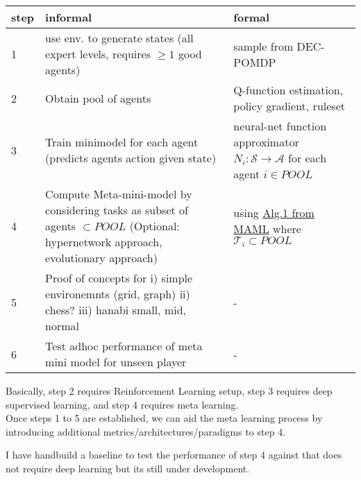 \documentclass[a4paper, 11pt]{article}
\begin{document}
\begin{tabularx}{\textwidth}{|l|X|X|}
    step & informal & formal \\
\hline
    1 & use env. to generate states 
		(all expert levels, requires $\geq 1$  good agents)  
	& sample from DEC-POMDP \\
\hline
    2 & Obtain pool of agents 
	& Q-function estimation, policy gradient, ruleset\\
\hline
    3 & Train minimodel for each agent (predicts agents action given state) & neural-net function approximator $N_i: \mathcal{S} \rightarrow \mathcal{A}$ for each agent $i \in POOL$\\
\hline
   4 & Compute Meta-mini-model by considering tasks as subset of agents $\subset POOL$ (Optional: hypernetwork approach, evolutionary approach) & using \href{https://proceedings.mlr.press/v70/finn17a/finn17a.pdf}{Alg.1 from MAML} where $\mathcal{T}_i \subset{POOL}$ \\
\hline
  5 & Proof of concepts for i) simple environemnts (grid, graph)  ii) chess? iii) hanabi small, mid, normal & - \\
\hline
  6 & Test adhoc performance of meta mini model for unseen player & -\\
\hline 
\end{tabularx}

Basically, step 2 requires Reinforcement Learning setup, step 3 requires deep supervised learning, and step 4 requires meta learning. \\

Once steps 1 to 5 are established, we can aid the meta learning process by introducing additional metrics/architectures/paradigms to step 4. 

I have handbuild a baseline to test the performance of step 4 against that does not require deep learning but its still under development.
\end{document}
